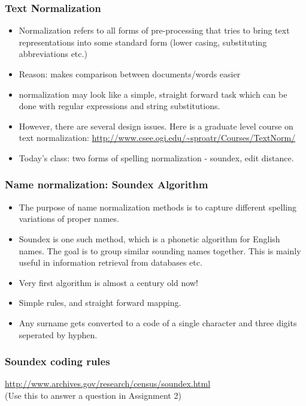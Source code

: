 \documentclass{beamer}
\begin{document}
\begin{frame}
\frametitle{Text Normalization}
\begin{itemize}
\item Normalization refers to all forms of pre-processing that tries to bring text representations into some standard form (lower casing, substituting abbreviations etc.)
\item Reason: makes comparison between documents/words easier
 \item normalization may look like a simple, straight forward task which can be done with regular expressions and string substitutions. 
\item However, there are several design issues. Here is a graduate level course on text normalization: \url{http://www.csee.ogi.edu/~sproatr/Courses/TextNorm/}
\item Today's class: two forms of spelling normalization - soundex, edit distance.
\end{itemize}
\end{frame}

\begin{frame}
\frametitle{Name normalization: Soundex Algorithm}
\begin{itemize}
\item The purpose of name normalization methods is to capture different spelling variations of proper names.
\item Soundex is one such method, which is a phonetic algorithm for English names. The goal is to group similar sounding names together. This is mainly useful in information retrieval from databases etc.
\item Very first algorithm is almost a century old now!
\item Simple rules, and straight forward mapping. 
\item Any surname gets converted to a code of a single character and three digits seperated by hyphen.
\end{itemize}
\end{frame}

\begin{frame}
\frametitle{Soundex coding rules}
\url{http://www.archives.gov/research/census/soundex.html}
\\(Use this to answer a question in Assignment 2)
\end{frame}
\end{document}
